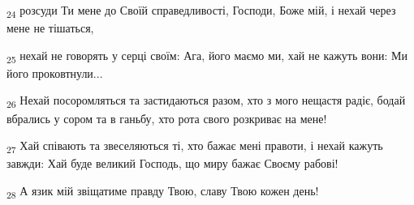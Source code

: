 \begin{tcolorbox}
\textsubscript{24} розсуди Ти мене до Своїй справедливості, Господи, Боже мій, і нехай через мене не тішаться,
\end{tcolorbox}
\begin{tcolorbox}
\textsubscript{25} нехай не говорять у серці своїм: Ага, його маємо ми, хай не кажуть вони: Ми його проковтнули...
\end{tcolorbox}
\begin{tcolorbox}
\textsubscript{26} Нехай посоромляться та застидаються разом, хто з мого нещастя радіє, бодай вбрались у сором та в ганьбу, хто рота свого розкриває на мене!
\end{tcolorbox}
\begin{tcolorbox}
\textsubscript{27} Хай співають та звеселяються ті, хто бажає мені правоти, і нехай кажуть завжди: Хай буде великий Господь, що миру бажає Своєму рабові!
\end{tcolorbox}
\begin{tcolorbox}
\textsubscript{28} А язик мій звіщатиме правду Твою, славу Твою кожен день!
\end{tcolorbox}
